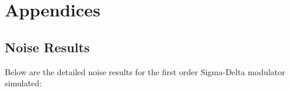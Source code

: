 \section{Appendices}

\subsection{Noise Results}
\label{Appendices:noise}
Below are the detailed noise results for the first order Sigma-Delta modulator simulated:



